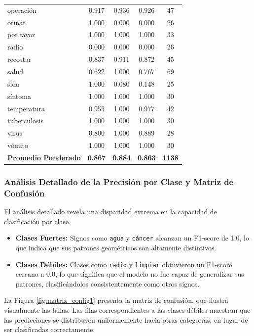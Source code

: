 \begin{table}[H]
{\begin{tabular}{|l|c|c|c|c|}
            operación & 0.917 & 0.936 & 0.926 & 47 \\
            orinar & 1.000 & 0.000 & 0.000 & 26 \\
            por favor & 1.000 & 1.000 & 1.000 & 33 \\
            radio & 0.000 & 0.000 & 0.000 & 26 \\
            recostar & 0.837 & 0.911 & 0.872 & 45 \\
            salud & 0.622 & 1.000 & 0.767 & 69 \\
            sida & 1.000 & 0.080 & 0.148 & 25 \\
            síntoma & 1.000 & 1.000 & 1.000 & 30 \\
            temperatura & 0.955 & 1.000 & 0.977 & 42 \\
            tuberculosis & 1.000 & 1.000 & 1.000 & 30 \\
            virus & 0.800 & 1.000 & 0.889 & 28 \\
            vómito & 1.000 & 1.000 & 1.000 & 30 \\
            \hline
            \textbf{Promedio Ponderado} & \textbf{0.867} & \textbf{0.884} & \textbf{0.863} & \textbf{1138} \\
            \hline
        \end{tabular}
    }
\end{table}

\subsubsection{Análisis Detallado de la Precisión por Clase y Matriz de Confusión}
\label{sec:analisis_clase_c1}

El análisis detallado revela una disparidad extrema en la capacidad de clasificación por clase.

\begin{itemize}
    \item \textbf{Clases Fuertes:} Signos como \lstinline|agua| y \lstinline|cáncer| alcanzan un F1-score de 1.0, lo que indica que sus patrones geométricos son altamente distintivos.
    \item \textbf{Clases Débiles:} Clases como \lstinline|radio| y \lstinline|limpiar| obtuvieron un F1-score cercano a 0.0, lo que significa que el modelo no fue capaz de generalizar sus patrones, clasificándolos consistentemente como otros signos.
\end{itemize}

La Figura \ref{fig:matriz_config1} presenta la matriz de confusión, que ilustra visualmente las fallas. Las filas correspondientes a las clases débiles muestran que las predicciones se distribuyen uniformemente hacia otras categorías, en lugar de ser clasificadas correctamente.

